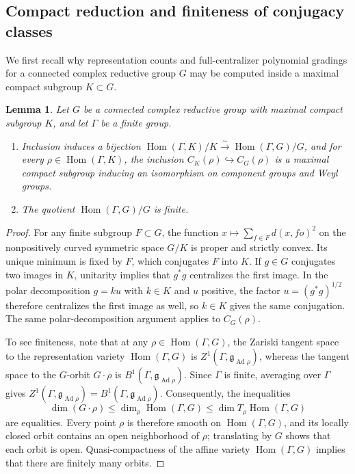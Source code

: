 \documentclass[11pt,a4paper,reqno]{amsart}
\theoremstyle{plain}
\newtheorem{lemma}[theorem]{Lemma}
\theoremstyle{definition}
\theoremstyle{remark}
\numberwithin{equation}{section}
\DeclareMathOperator{\Hom}{Hom}
\DeclareMathOperator{\Ad}{Ad}
\newcommand{\fg}{\mathfrak g}
\begin{document}
\subsection{Compact reduction and finiteness of conjugacy classes}
We first recall why representation counts and full-centralizer polynomial gradings for a connected complex reductive group $G$ may be computed inside a maximal compact subgroup $K\subset G$.

\begin{lemma}\label{lem:compact-reduction}
Let $G$ be a connected complex reductive group with maximal compact subgroup $K$, and let $\Gamma$ be a finite group.
\begin{enumerate}[label=\textup{(\arabic*)},leftmargin=2em]
\item Inclusion induces a bijection $\Hom(\Gamma,K)/K\xrightarrow{\sim}\Hom(\Gamma,G)/G$, and for every $\rho\in\Hom(\Gamma,K)$, the inclusion $C_K(\rho)\hookrightarrow C_G(\rho)$ is a maximal compact subgroup inducing an isomorphism on component groups and Weyl groups.
\item The quotient $\Hom(\Gamma,G)/G$ is finite.
\end{enumerate}
\end{lemma}
\begin{proof}
For any finite subgroup $F\subset G$, the function $x\mapsto\sum_{f\in F}d(x,fo)^2$ on the nonpositively curved symmetric space $G/K$ is proper and strictly convex. Its unique minimum is fixed by $F$, which conjugates $F$ into $K$. If $g\in G$ conjugates two images in $K$, unitarity implies that $g^*g$ centralizes the first image. In the polar decomposition $g=ku$ with $k\in K$ and $u$ positive, the factor $u=(g^*g)^{1/2}$ therefore centralizes the first image as well, so $k\in K$ gives the same conjugation. The same polar-decomposition argument applies to $C_G(\rho)$.

To see finiteness, note that at any $\rho\in\Hom(\Gamma,G)$, the Zariski tangent space to the representation variety $\Hom(\Gamma,G)$ is $Z^1(\Gamma,\fg_{\Ad\rho})$, whereas the tangent space to the $G$-orbit $G\cdot\rho$ is $B^1(\Gamma,\fg_{\Ad\rho})$. Since $\Gamma$ is finite, averaging over $\Gamma$ gives $Z^1(\Gamma,\fg_{\Ad\rho})=B^1(\Gamma,\fg_{\Ad\rho})$. Consequently, the inequalities
\[
\dim(G\cdot\rho)\le\dim_\rho\Hom(\Gamma,G)\le\dim T_\rho\Hom(\Gamma,G)
\]
are equalities. Every point $\rho$ is therefore smooth on $\Hom(\Gamma,G)$, and its locally closed orbit contains an open neighborhood of $\rho$; translating by $G$ shows that each orbit is open. Quasi-compactness of the affine variety $\Hom(\Gamma,G)$ implies that there are finitely many orbits.
\end{proof}
\end{document}
